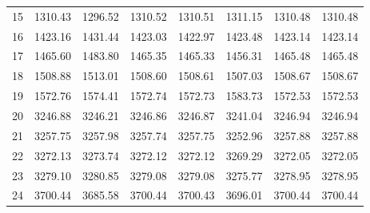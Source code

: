 \documentclass[10pt,oneside]{article}
\begin{document}
\begin{table}[h!]
\begin{tabular}{cccccccc}
15 &   1310.43 & 1296.52 & 1310.52 &    1310.51 &      1311.15 & 1310.48 &   1310.48 \\
16 &   1423.16 & 1431.44 & 1423.03 &    1422.97 &      1423.48 & 1423.14 &   1423.14 \\
17 &   1465.60 & 1483.80 & 1465.35 &    1465.33 &      1456.31 & 1465.48 &   1465.48 \\
18 &   1508.88 & 1513.01 & 1508.60 &    1508.61 &      1507.03 & 1508.67 &   1508.67 \\
19 &   1572.76 & 1574.41 & 1572.74 &    1572.73 &      1583.73 & 1572.53 &   1572.53 \\
20 &   3246.88 & 3246.21 & 3246.86 &    3246.87 &      3241.04 & 3246.94 &   3246.94 \\
21 &   3257.75 & 3257.98 & 3257.74 &    3257.75 &      3252.96 & 3257.88 &   3257.88 \\
22 &   3272.13 & 3273.74 & 3272.12 &    3272.12 &      3269.29 & 3272.05 &   3272.05 \\
23 &   3279.10 & 3280.85 & 3279.08 &    3279.08 &      3275.77 & 3278.95 &   3278.95 \\
24 &   3700.44 & 3685.58 & 3700.44 &    3700.43 &      3696.01 & 3700.44 &   3700.44 \\
\bottomrule
\end{tabular}
\end{table}
\end{document}

